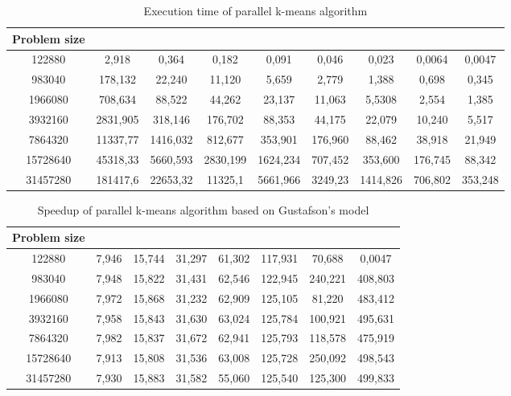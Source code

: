 \documentclass[runningheads]{llncs}
\begin{document}
\begin{table}
\caption{Execution time of parallel k-means algorithm}\label{Tab:tab1}
\centering
\begin{tabular}{|c|c|c|c|c|c|c|c|c|}
\hline
Problem size &  &  &  &  &  &  &  & \\
\hline
122880 & 2,918 & 0,364 & 0,182 & 0,091 & 0,046 & 0,023 & 0,0064 & 0,0047 \\
\hline
983040 & 178,132 & 22,240 & 11,120 & 5,659 & 2,779 & 1,388 & 0,698 & 0,345 \\
\hline
1966080 & 708,634 & 88,522 & 44,262 & 23,137 & 11,063 & 5,5308 & 2,554 & 1,385 \\
\hline
3932160 & 2831,905 & 318,146 & 176,702 & 88,353 & 44,175 & 22,079 & 10,240 & 5,517 \\
\hline
7864320 & 11337,77 & 1416,032 & 812,677 & 353,901 & 176,960 & 88,462 & 38,918 & 21,949 \\
\hline
15728640 & 45318,33 & 5660,593 & 2830,199 & 1624,234 & 707,452 & 353,600 & 176,745 & 88,342 \\
\hline
31457280 & 181417,6 & 22653,32 & 11325,1 & 5661,966 & 3249,23 & 1414,826 & 706,802 & 353,248 \\
\hline
\end{tabular}
\end{table}

\begin{table}
\caption{Speedup of parallel k-means algorithm based on Gustafson's model}\label{Tab:tab2}
\centering
\begin{tabular}{|c|c|c|c|c|c|c|c|}
\hline
Problem size &  &  &  &  &  &  & \\
\hline
122880 & 7,946 & 15,744 & 31,297 & 61,302 & 117,931 & 70,688 & 0,0047 \\
\hline
983040 & 7,948 & 15,822 & 31,431 & 62,546 & 122,945 & 240,221 & 408,803 \\
\hline
1966080 & 7,972 & 15,868 & 31,232 & 62,909 & 125,105 & 81,220 & 483,412 \\
\hline
3932160 & 7,958 & 15,843 & 31,630 & 63,024 & 125,784 & 100,921 & 495,631 \\
\hline
7864320 & 7,982 & 15,837 & 31,672 & 62,941 & 125,793 & 118,578 & 475,919 \\
\hline
15728640 & 7,913 & 15,808 & 31,536 & 63,008 & 125,728 & 250,092 & 498,543 \\
\hline
31457280 & 7,930 & 15,883 & 31,582 & 55,060 & 125,540 & 125,300 & 499,833 \\
\hline
\end{tabular}
\end{table}
\end{document}
